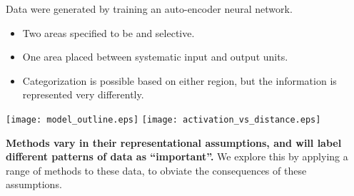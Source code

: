 Data were generated by training an auto-encoder neural network.
\begin{itemize}\compresslist
\item Two areas specified to be \A and \B selective.
\item One area placed between systematic input and output units.
\item Categorization is possible based on either region, but the information is represented very differently.
\end{itemize}

\begin{center}
{\texttt{[image: model\_outline.eps]}}
{\texttt{[image: activation\_vs\_distance.eps]}}
\end{center}

{\bf Methods vary in their representational assumptions, and will label different patterns of data as ``important''.} We explore this by applying a range of methods to these data, to obviate the consequences of these assumptions.